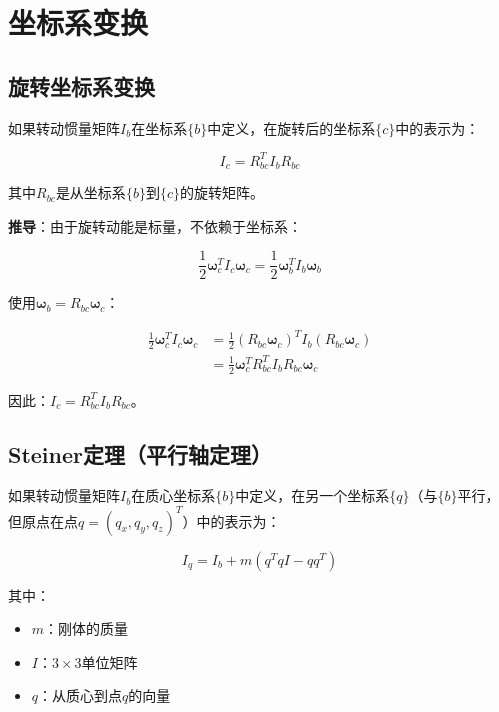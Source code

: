 \documentclass[12pt,a4paper]{article}
\begin{document}
\section{坐标系变换}

\subsection{旋转坐标系变换}

如果转动惯量矩阵$I_b$在坐标系$\{b\}$中定义，在旋转后的坐标系$\{c\}$中的表示为：

\begin{equation}
I_c = R_{bc}^T I_b R_{bc}
\label{eq:rotation_transform}
\end{equation}

其中$R_{bc}$是从坐标系$\{b\}$到$\{c\}$的旋转矩阵。

\textbf{推导}：由于旋转动能是标量，不依赖于坐标系：

\begin{equation}
\frac{1}{2} \bm{\omega}_c^T I_c \bm{\omega}_c = \frac{1}{2} \bm{\omega}_b^T I_b \bm{\omega}_b
\end{equation}

使用$\bm{\omega}_b = R_{bc} \bm{\omega}_c$：

\begin{align}
\frac{1}{2} \bm{\omega}_c^T I_c \bm{\omega}_c &= \frac{1}{2} (R_{bc} \bm{\omega}_c)^T I_b (R_{bc} \bm{\omega}_c) \\
&= \frac{1}{2} \bm{\omega}_c^T R_{bc}^T I_b R_{bc} \bm{\omega}_c
\end{align}

因此：$I_c = R_{bc}^T I_b R_{bc}$。

\subsection{Steiner定理（平行轴定理）}

如果转动惯量矩阵$I_b$在质心坐标系$\{b\}$中定义，在另一个坐标系$\{q\}$（与$\{b\}$平行，但原点在点$q = (q_x, q_y, q_z)^T$）中的表示为：

\begin{equation}
I_q = I_b + m(q^T q I - q q^T)
\label{eq:steiner}
\end{equation}

其中：
\begin{itemize}
\item $m$：刚体的质量
\item $I$：$3 \times 3$单位矩阵
\item $q$：从质心到点$q$的向量
\end{itemize}
\end{document}
